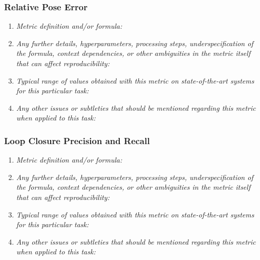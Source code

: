 \documentclass[a4paper,11pt]{article}
\begin{document}
        \subsubsection{Relative Pose Error}
            \begin{enumerate}[label=\alph*.]
                \item \textit{Metric definition and/or formula:}
                \bigskip
                \item \textit{Any further details, hyperparameters, processing steps, underspecification of the formula, context dependencies, or other ambiguities in the metric itself that can affect reproducibility:}
                \bigskip
                \item \textit{Typical range of values obtained with this metric on state-of-the-art systems for this particular task:}
                \bigskip
                \item \textit{Any other issues or subtleties that should be mentioned regarding this metric when applied to this task:}
                \bigskip
            \end{enumerate}
        \subsubsection{Loop Closure Precision and Recall}
            \begin{enumerate}[label=\alph*.]
                \item \textit{Metric definition and/or formula:}
                \bigskip
                \item \textit{Any further details, hyperparameters, processing steps, underspecification of the formula, context dependencies, or other ambiguities in the metric itself that can affect reproducibility:}
                \bigskip
                \item \textit{Typical range of values obtained with this metric on state-of-the-art systems for this particular task:}
                \bigskip
                \item \textit{Any other issues or subtleties that should be mentioned regarding this metric when applied to this task:}
                \bigskip
            \end{enumerate}
\end{document}
